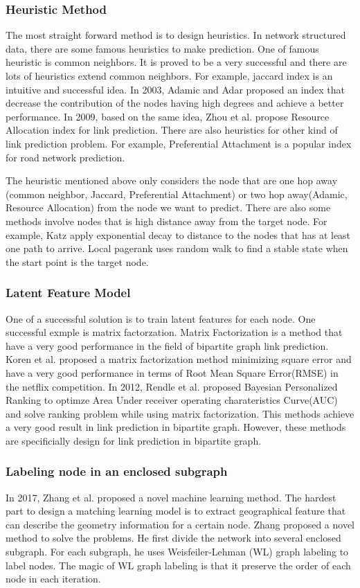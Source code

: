 \documentclass[paper=letter, fontsize=12pt]{scrartcl} %
\begin{document}
\subsubsection{Heuristic Method}
The most straight forward method is to design heuristics.
In network structured data, there are some famous heuristics to make prediction. One of famous heuristic is common neighbors. It is proved to be a very successful and there are lots of heuristics extend common neighbors. For example, jaccard index is an intuitive and successful idea. In 2003, Adamic and Adar \cite{adar} proposed an index that decrease the contribution of the nodes having high degrees and achieve a better performance. In 2009, based on the same idea, Zhou et al. \cite{ra} propose Resource Allocation index for link prediction. There are also heuristics for other kind of link prediction problem. For example, Preferential Attachment \cite{pa} is a popular index for road network prediction.

The heuristic mentioned above only considers the node that are one hop away (common neighbor, Jaccard, Preferential Attachment) or two hop away(Adamic, Resource Allocation) from the node we want to predict. There are also some methods involve nodes that is high distance away from the target node. For example, Katz \cite{katz} apply exponential decay to distance to the nodes that has at least one path to arrive. Local pagerank uses random walk to find a stable state when the start point is the target node.  

\subsubsection {Latent Feature Model}
One of a successful solution is to train latent features for each node. One successful exmple is matrix factorzation. Matrix Factorization is a method that have a very good performance in the field of bipartite graph link prediction. Koren et al. proposed a matrix factorization \cite{mf} method minimizing square error and have a very good performance in terms of Root Mean Square Error(RMSE) in the netflix competition. In 2012, Rendle et al. \cite{bprmf} proposed Bayesian Personalized Ranking to optimze Area Under receiver operating charateristics Curve(AUC) and solve ranking problem while using matrix factorization. This methods achieve a very good result in link prediction in bipartite graph. However, these methods are specificially design for link prediction in bipartite graph. 

\subsubsection {Labeling node in an enclosed subgraph}
In 2017, Zhang et al. proposed a novel machine learning method. The hardest part to design a matching learning model is to extract geographical feature that can describe the geometry information for a certain node. Zhang proposed a novel method to solve the problems. He first divide the network into several enclosed subgraph. For each subgraph, he uses Weisfeiler-Lehman (WL) graph labeling to label nodes. The magic of WL graph labeling is that it preserve the order of each node in each iteration.
\end{document}
